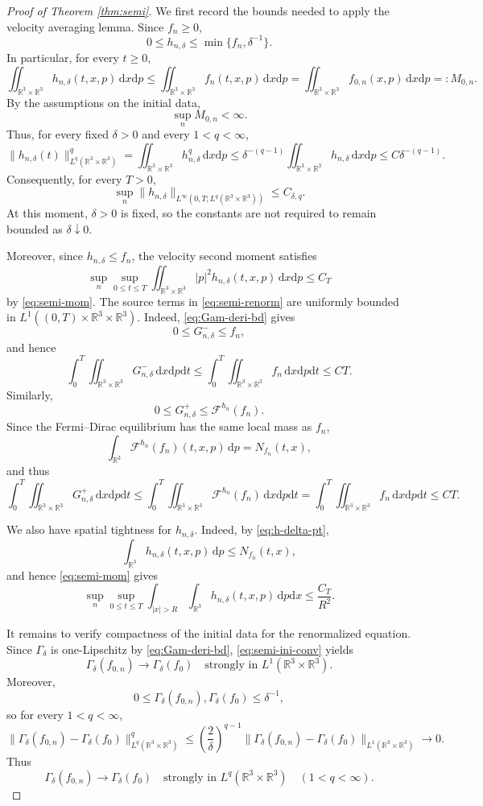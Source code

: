 \documentclass[10pt,reqno]{amsart}
\numberwithin{equation}{section}
\theoremstyle{definition}
\newcommand{\R}{\mathbb R}
\newcommand{\dx}{\mathrm{d}x}
\newcommand{\dpp}{\mathrm{d}p}
\newcommand{\dt}{\mathrm{d}t}
\newcommand{\calF}{\mathcal F}
\newcommand{\bq}{\begin{equation}}
\newcommand{\eq}{\end{equation}}
\newcommand{\lt}{\left}
\newcommand{\rt}{\right}
\begin{document}
\begin{proof}[Proof of Theorem \ref{thm:semi}]
We first record the bounds needed to apply the velocity averaging
lemma.  Since $f_n\geq0$,
\bq \label{eq:h-delta-pt}
 0\leq h_{n,\delta}  \leq \min\{f_n,\delta^{-1}\}.
\eq
In particular, for every $t\geq0$,
\[
 \iint_{\R^3\times\R^3}  h_{n,\delta}(t,x,p)\,\dx\dpp  \leq  \iint_{\R^3\times\R^3}  f_n(t,x,p)\,\dx\dpp  =  \iint_{\R^3\times\R^3}  f_{0,n}(x,p)\,\dx\dpp  =:M_{0,n}.
\]
By the assumptions on the initial data,
\[
 \sup_n M_{0,n}<\infty.
\]
Thus, for every fixed $\delta>0$ and every $1<q<\infty$,
\[
 \|h_{n,\delta}(t)\|_{L^q(\R^3\times\R^3)}^q  =  \iint_{\R^3\times\R^3}  h_{n,\delta}^q\,\dx\dpp  \leq  \delta^{-(q-1)}  \iint_{\R^3\times\R^3}  h_{n,\delta}\,\dx\dpp  \leq  C\delta^{-(q-1)}.
\]
Consequently, for every $T>0$,
\[
 \sup_n  \|h_{n,\delta}\|_{L^\infty(0,T;L^q(\R^3\times\R^3))}  \leq C_{\delta,q}.
\]
At this moment, $\delta>0$ is fixed, so the constants are not required to remain bounded as $\delta\downarrow0$.

Moreover, since $h_{n,\delta}\leq f_n$, the velocity second moment satisfies
\[
 \sup_n\sup_{0\leq t\leq T}  \iint_{\R^3\times\R^3}  |p|^2h_{n,\delta}(t,x,p)\,\dx\dpp  \leq C_T
\]
by \eqref{eq:semi-mom}.  The source terms in \eqref{eq:semi-renorm} are uniformly bounded in $L^1((0,T)\times\R^3\times\R^3)$.  Indeed, \eqref{eq:Gam-deri-bd} gives
\[
 0\leq G_{n,\delta}^-\leq f_n,
\]
and hence
\[
 \int_0^T\iint_{\R^3\times\R^3}  G_{n,\delta}^-\,\dx\dpp\dt  \leq  \int_0^T\iint_{\R^3\times\R^3}  f_n\,\dx\dpp\dt  \leq C T.
\]
Similarly,
\[
 0\leq  G_{n,\delta}^+  \leq  \calF^{\hbar_n}(f_n).
\]
Since the Fermi--Dirac equilibrium has the same local mass as $f_n$,
\[
 \int_{\R^3}  \calF^{\hbar_n}(f_n)(t,x,p)\,\dpp  =  N_{f_n}(t,x),
\]
and thus
\[
 \int_0^T\iint_{\R^3\times\R^3}  G_{n,\delta}^+\,\dx\dpp\dt  \leq  \int_0^T\iint_{\R^3\times\R^3}  \calF^{\hbar_n}(f_n)\,\dx\dpp\dt =  \int_0^T\iint_{\R^3\times\R^3}  f_n\,\dx\dpp\dt  \leq CT.
\]

We also have spatial tightness for $h_{n,\delta}$.  Indeed, by \eqref{eq:h-delta-pt},
\[
 \int_{\R^3}h_{n,\delta}(t,x,p)\,\dpp  \leq N_{f_n}(t,x),
\]
and hence \eqref{eq:semi-mom} gives
\[
 \sup_n\sup_{0\leq t\leq T}  \int_{|x|>R}\int_{\R^3}  h_{n,\delta}(t,x,p)\,\dpp\dx  \leq \frac{C_T}{R^2}.
\]

It remains to verify compactness of the initial data for the renormalized equation.  Since $\Gamma_\delta$ is one-Lipschitz by \eqref{eq:Gam-deri-bd}, \eqref{eq:semi-ini-conv} yields
\[
 \Gamma_\delta(f_{0,n}) \to  \Gamma_\delta(f_0)  \quad\text{strongly in }  L^1(\R^3\times\R^3).
\]
Moreover,
\[
 0\leq  \Gamma_\delta(f_{0,n}),  \Gamma_\delta(f_0)  \leq\delta^{-1},
\]
so for every $1<q<\infty$,
\[
 \|\Gamma_\delta(f_{0,n})        -\Gamma_\delta(f_0)\|_{L^q(\R^3\times\R^3)}^q \leq  \lt(\frac{2}{\delta}\rt)^{q-1}  \|\Gamma_\delta(f_{0,n})        -\Gamma_\delta(f_0)\|_{L^1(\R^3\times\R^3)} \to0.
\]
Thus
\[
 \Gamma_\delta(f_{0,n}) \to  \Gamma_\delta(f_0)  \quad\text{strongly in }  L^q(\R^3\times\R^3)  \quad(1<q<\infty).
\]


\end{proof}
\end{document}
